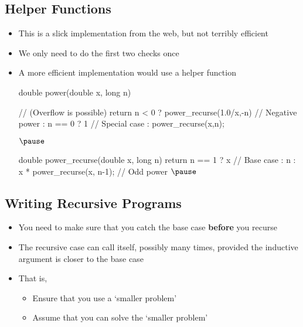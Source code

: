 \begin{slide}
\section[-2]{Helper Functions}

\begin{PauseHighLight}\squeeze
  \begin{itemize}
  \item This is a slick implementation from the web, but not
    terribly efficient\pause
  \item We only need to do the first two checks once\pause
  \item A more efficient implementation would use a helper function
    \begin{java}
    double power(double x, long n) { //  (Overflow is possible)
        return  n <  0  ? power_recurse(1.0/x,-n)  //  Negative power 
            :  n == 0   ? 1                        //  Special case
            : power_recurse(x,n);

    }$\pause$

    double power_recurse(double x, long n) {
       return  n == 1  ? x                               //  Base case
           : n%
           :             x * power_recurse(x, n-1);      //  Odd power
    }$\pause$
    \end{java}
  \end{itemize}
\end{PauseHighLight}

\end{slide}




\begin{slide}
\section{Writing Recursive Programs}

\begin{PauseHighLight}
\begin{itemize}
\item You need to make sure that you catch the base case \textbf{before}
  you recurse\pause
\item The recursive case can call itself, possibly many times, provided
  the inductive argument is closer to the base case\pause
\item That is,
  \begin{itemize}
  \item Ensure that you use a `smaller problem'\pause
  \item Assume that you can solve the `smaller problem'\pause
  \end{itemize}
\end{itemize}
\end{PauseHighLight}
\end{slide}

